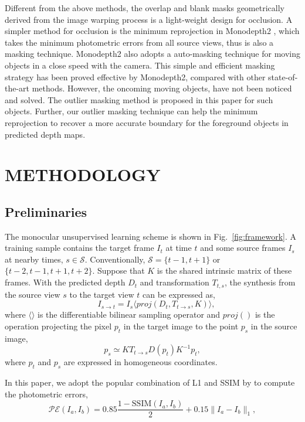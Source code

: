 \documentclass[letterpaper, 10 pt, conference]{ieeeconf}
\begin{document}
Different from the above methods, the overlap and blank masks geometrically derived from the image warping process \cite{wang2019unsupervised} is a light-weight design for occlusion. A simpler method for occlusion is the {minimum reprojection} in Monodepth2 \cite{godard2019digging}, which takes the minimum photometric errors from all source views, thus is also a masking technique. Monodepth2 also adopts a {auto-masking} technique for moving objects in a close speed with the camera. This simple and efficient masking strategy has been proved effective by Monodepth2, compared with other state-of-the-art methods. However, the oncoming moving objects, have not been noticed and solved. The outlier masking method is proposed in this paper for such objects. Further, our {outlier masking} technique can help the {minimum reprojection} to recover a more accurate boundary for the foreground objects in predicted depth maps. 



\section{METHODOLOGY}
\subsection{Preliminaries}
The monocular unsupervised learning scheme is shown in Fig.~\ref{fig:framework}.
A training sample contains the target frame $I_t$ at time $t$ and some source frames $I_s$ at nearby times, $s \in \mathcal{S}$. Conventionally,  $\mathcal{S} = \{t-1, t+1\}$ or $\{t-2, t-1, t+1, t+2\}$. Suppose that $K$ is the shared intrinsic matrix of these frames. With the predicted depth $D_t$ and transformation $T_{t, s}$, the synthesis from the source view $s$ to the target view $t$ can be expressed as,
\begin{equation}
\quad I_{s \to t} = I_{s}\langle proj(D_t, T_{t \to s}, K) \rangle, 
\label{eq-synth}
\end{equation}
where $\big\langle\big\rangle$ is the differentiable bilinear sampling operator \cite{jaderberg2015spatial} and $proj()$ is the operation projecting the pixel $p_t$ in the target image to the point $p_s$ in the source image, 
\begin{equation}
p_s \simeq KT_{t \to s}D(p_t)K^{-1}p_t,
\label{eq:proj}
\end{equation}
where $p_t$ and $p_s$ are expressed in homogeneous coordinates. 

In this paper, we adopt the popular  combination of L1 and SSIM by \cite{godard2017unsupervised} to compute the photometric errors, 
\begin{equation}
\mathcal{PE}(I_a, I_b) = 0.85 \frac{1 - \mathrm{SSIM}(I_a, I_b)}{2} + 0.15 \|I_a - I_b\|_1,
\end{equation}
\end{document}
